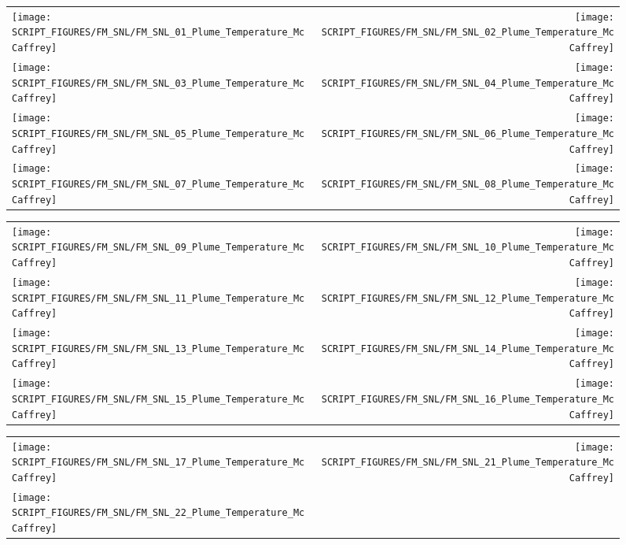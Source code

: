 \begin{figure}[p]
\begin{tabular*}{\textwidth}{l@{\extracolsep{\fill}}r}
\texttt{[image: SCRIPT\_FIGURES/FM\_SNL/FM\_SNL\_01\_Plume\_Temperature\_McCaffrey]} &
\texttt{[image: SCRIPT\_FIGURES/FM\_SNL/FM\_SNL\_02\_Plume\_Temperature\_McCaffrey]} \\
\texttt{[image: SCRIPT\_FIGURES/FM\_SNL/FM\_SNL\_03\_Plume\_Temperature\_McCaffrey]} &
\texttt{[image: SCRIPT\_FIGURES/FM\_SNL/FM\_SNL\_04\_Plume\_Temperature\_McCaffrey]} \\
\texttt{[image: SCRIPT\_FIGURES/FM\_SNL/FM\_SNL\_05\_Plume\_Temperature\_McCaffrey]} &
\texttt{[image: SCRIPT\_FIGURES/FM\_SNL/FM\_SNL\_06\_Plume\_Temperature\_McCaffrey]} \\
\texttt{[image: SCRIPT\_FIGURES/FM\_SNL/FM\_SNL\_07\_Plume\_Temperature\_McCaffrey]} &
\texttt{[image: SCRIPT\_FIGURES/FM\_SNL/FM\_SNL\_08\_Plume\_Temperature\_McCaffrey]}
\end{tabular*}
\end{figure}

\begin{figure}[p]
\begin{tabular*}{\textwidth}{l@{\extracolsep{\fill}}r}
\texttt{[image: SCRIPT\_FIGURES/FM\_SNL/FM\_SNL\_09\_Plume\_Temperature\_McCaffrey]} &
\texttt{[image: SCRIPT\_FIGURES/FM\_SNL/FM\_SNL\_10\_Plume\_Temperature\_McCaffrey]} \\
\texttt{[image: SCRIPT\_FIGURES/FM\_SNL/FM\_SNL\_11\_Plume\_Temperature\_McCaffrey]} &
\texttt{[image: SCRIPT\_FIGURES/FM\_SNL/FM\_SNL\_12\_Plume\_Temperature\_McCaffrey]} \\
\texttt{[image: SCRIPT\_FIGURES/FM\_SNL/FM\_SNL\_13\_Plume\_Temperature\_McCaffrey]} &
\texttt{[image: SCRIPT\_FIGURES/FM\_SNL/FM\_SNL\_14\_Plume\_Temperature\_McCaffrey]} \\
\texttt{[image: SCRIPT\_FIGURES/FM\_SNL/FM\_SNL\_15\_Plume\_Temperature\_McCaffrey]} &
\texttt{[image: SCRIPT\_FIGURES/FM\_SNL/FM\_SNL\_16\_Plume\_Temperature\_McCaffrey]}
\end{tabular*}
\end{figure}

\begin{figure}[p]
\begin{tabular*}{\textwidth}{l@{\extracolsep{\fill}}r}
\texttt{[image: SCRIPT\_FIGURES/FM\_SNL/FM\_SNL\_17\_Plume\_Temperature\_McCaffrey]} &
\texttt{[image: SCRIPT\_FIGURES/FM\_SNL/FM\_SNL\_21\_Plume\_Temperature\_McCaffrey]} \\
\texttt{[image: SCRIPT\_FIGURES/FM\_SNL/FM\_SNL\_22\_Plume\_Temperature\_McCaffrey]}
\end{tabular*}
\end{figure}

